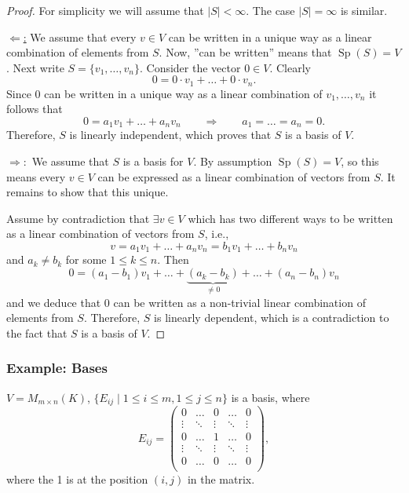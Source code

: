 \begin{proof}
	For simplicity we will assume that $|S| < \infty$. The case $|S| = \infty$ is similar.
	
	\underline{$\Longleftarrow$:} We assume that every $v \in V$ can be written in a unique way as a linear combination of elements from $S$. Now, ''can be written'' means that $\operatorname{Sp}(S) = V$. Next write $S = \{v_1, \hdots , v_n\}$. Consider the vector $0 \in V$. Clearly 
	\[
		0 = 0\cdot v_1 + \hdots + 0 \cdot v_n.
	\]
	Since 0 can be written in a unique way as a linear combination of $v_1, \hdots , v_n$ it follows that
	\[
		0 = a_1 v_1 + \hdots + a_n v_n \qquad \Longrightarrow \qquad a_1 = \hdots = a_n = 0.
	\]
	Therefore, $S$ is linearly independent, which proves that $S$ is a basis of $V$.
	
	\underline{$\Longrightarrow:$} We assume that $S$ is a basis for $V$. By assumption $\operatorname{Sp}(S) = V$, so this means every $v \in V$ can be expressed as a linear combination of vectors from $S$. It remains to show that this unique.
	
	Assume by contradiction that $\exists v \in V$ which has two different ways to be written as a linear combination of vectors from $S$, i.e., 
	\[
		v = a_1 v_1 + \hdots + a_n v_n = b_1 v_1 + \hdots + b_n v_n
	\]
	and $a_k \neq b_k$ for some $1 \leq k \leq n$. Then
	\[
		0 = (a_1 - b_1)v_1 + \hdots + \underbrace{(a_k - b_k)}_{\displaystyle \neq 0} + \hdots + (a_n - b_n) v_n
	\]
	and we deduce that 0 can be written as a non-trivial linear combination of elements from $S$. Therefore, $S$ is linearly dependent, which is a contradiction to the fact that $S$ is a basis of $V$. \qedhere
\end{proof}

\subsubsection{Example: Bases}
\label{exp:bases}
$V = M_{m \times n}(K)$, $\{E_{ij} \;|\; 1 \leq i \leq m, 1 \leq j \leq n\}$ is a basis, where
\[
	E_{ij} = 
	\begin{pmatrix}
		0 & \hdots & 0 & \hdots & 0\\
		\vdots & \ddots & \vdots & \ddots & \vdots\\
		0 & \hdots & 1 & \hdots & 0\\
		\vdots & \ddots & \vdots & \ddots & \vdots\\
		0 & \hdots & 0 & \hdots & 0\\
	\end{pmatrix},
\]
where the 1 is at the position $(i,j)$ in the matrix.

